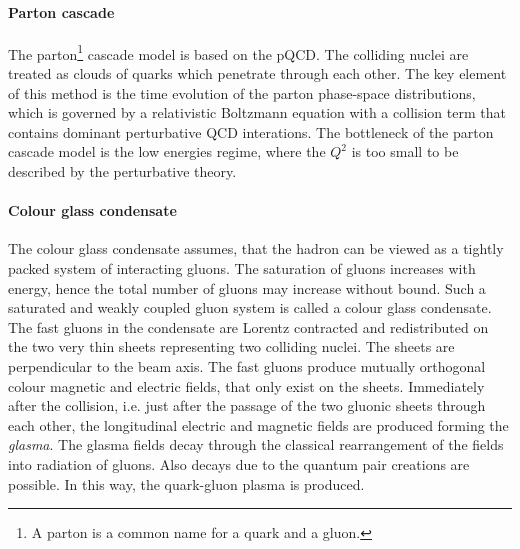       \paragraph{Parton cascade}
      The parton\footnote{A parton is a common name for a quark and a gluon.} cascade model is based on the pQCD.
      The colliding nuclei are treated as clouds of quarks which penetrate through each other.
      The key element of this method is the time evolution of the parton phase-space distributions, which is governed by a relativistic Boltzmann equation with a collision term that contains dominant perturbative QCD interations.
      The bottleneck of the parton cascade model is the low energies regime, where the $Q^2$ is too small to be described by the perturbative theory.
      \paragraph{Colour glass condensate}
      The colour glass condensate assumes, that the hadron can be viewed as a tightly packed system of interacting gluons.
      The saturation of gluons increases with energy, hence the total number of gluons may increase without bound.
      Such a saturated and weakly coupled gluon system is called a colour glass condensate.
      The fast gluons in the condensate are Lorentz contracted and redistributed on the two very thin sheets representing two colliding nuclei.
      The sheets are perpendicular to the beam axis.
      The fast gluons produce mutually orthogonal colour magnetic and electric fields, that only exist on the sheets.
      Immediately after the collision, i.e. just after the passage of the two gluonic sheets through each other, the longitudinal electric and magnetic fields are produced forming the \textit{glasma}.
      The glasma fields decay through the classical rearrangement of the fields into radiation of gluons.
      Also decays due to the quantum pair creations are possible.
      In this way, the quark-gluon plasma is produced.



